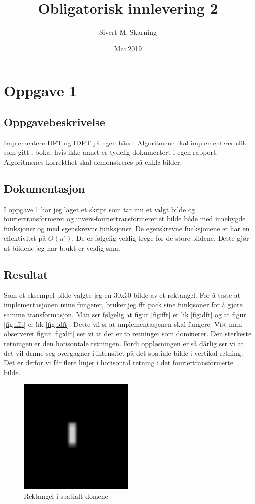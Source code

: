 \documentclass[a4paper, 12pt]{article}
\title{Obligatorisk innlevering 2}
\author{Sivert M. Skarning}
\date{Mai 2019}
\begin{document}
\maketitle

\section{Oppgave 1}
\subsection{Oppgavebeskrivelse}
Implementere DFT og IDFT på egen hånd. Algoritmene skal implementeres slik som gitt i boka, hvis ikke annet er tydelig dokumentert i egen rapport. Algoritmenes korrekthet skal demonstreres på enkle bilder.

\subsection{Dokumentasjon}
I oppgave 1 har jeg laget et skript som tar inn et valgt bilde og fouriertransformerer og invers-fouriertransformerer et bilde både med innebygde funksjoner og med egenskrevne funksjoner. De egenskrevne funksjonene er har en effektivitet på $O(n⁴)$. De er følgelig veldig trege for de store bildene. Dette gjør at bildene jeg har brukt er veldig små.
\subsection{Resultat}
Som et eksempel bilde valgte jeg en 30x30 bilde av et rektangel. For å teste at implementasjonen mine fungerer, bruker jeg fft pack sine funkjsoner for å gjøre samme transformasjon. Man ser følgelig at figur \ref{fig:fft} er lik \ref{fig:dft} og at figur \ref{fig:ifft} er lik \ref{fig:idft}. Dette vil si at implementasjonen skal fungere. Vist man observerer figur \ref{fig:dft} ser vi at det er to retninger som dominerer. Den sterkeste retningen er den horisontale retningen. Fordi oppløsningen er så dårlig ser vi at det vil danne seg overgagner i intensitet på det spatiale bilde i vertikal retning. Det er derfor vi får flere linjer i horisontal retning i det fouriertransformerte bilde. 


\begin{figure}[h]
  \centering
  \includegraphics[width=0.5\textwidth]{images/rektangel.png}
  \caption{Rektangel i spatialt domene}
  \label{fig:rektangel}
\end{figure}
\end{document}
